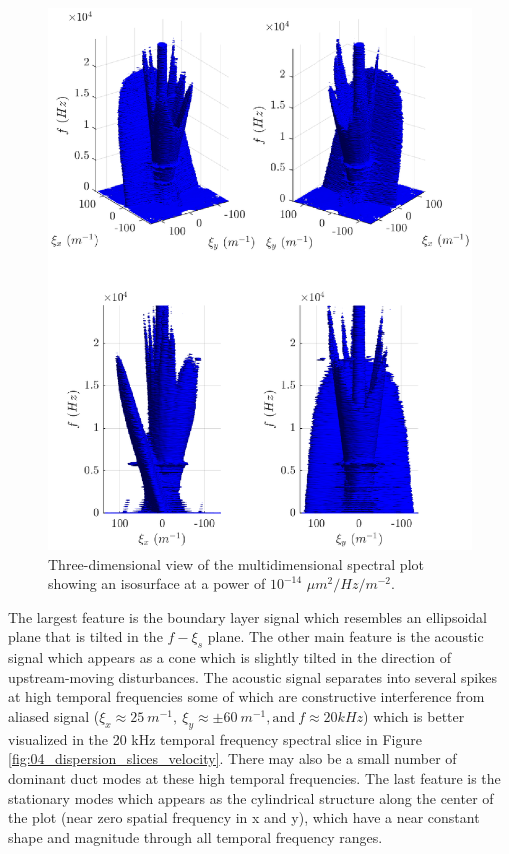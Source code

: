\begin{figure}
  \centering
  \includegraphics{../matlab/04_dispersion_analysis/dispersion_3d.eps}
  \caption{Three-dimensional view of the multidimensional spectral plot showing an isosurface at a power of $10^{-14}$ $\mu m^2/Hz/m^{-2}$.}
  \label{fig:04_dispersion_3d}
\end{figure}
The largest feature is the boundary layer signal which resembles an ellipsoidal plane that is tilted in the $f-\xi_s$ plane.
The other main feature is the acoustic signal which appears as a cone which is slightly tilted in the direction of upstream-moving disturbances.
The acoustic signal separates into several spikes at high temporal frequencies some of which are constructive interference from aliased signal ($\xi_x\approx25\ m^{-1},\ \xi_y\approx\pm60\ m^{-1}, \textrm{and}\ f\approx20 kHz$) which is better visualized in the 20 kHz temporal frequency spectral slice in Figure \ref{fig:04_dispersion_slices_velocity}.
There may also be a small number of dominant duct modes at these high temporal frequencies.
The last feature is the stationary modes which appears as the cylindrical structure along the center of the plot (near zero spatial frequency in x and y), which have a near constant shape and magnitude through all temporal frequency ranges.

